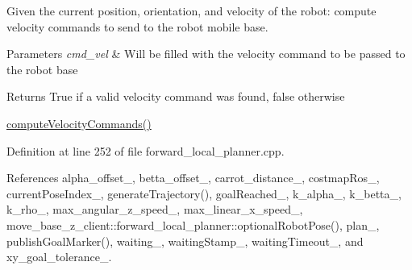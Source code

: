 Given the current position, orientation, and velocity of the robot\+: compute velocity commands to send to the robot mobile base. 


\begin{DoxyParams}{Parameters}
{\em cmd\+\_\+vel} & Will be filled with the velocity command to be passed to the robot base \\
\hline
\end{DoxyParams}
\begin{DoxyReturn}{Returns}
True if a valid velocity command was found, false otherwise
\end{DoxyReturn}
\hyperlink{classmove__base__z__client_1_1forward__local__planner_1_1ForwardLocalPlanner_a6eb89b6d08da6d4e84750705120e699a}{compute\+Velocity\+Commands()} 

Definition at line 252 of file forward\+\_\+local\+\_\+planner.\+cpp.



References alpha\+\_\+offset\+\_\+, betta\+\_\+offset\+\_\+, carrot\+\_\+distance\+\_\+, costmap\+Ros\+\_\+, current\+Pose\+Index\+\_\+, generate\+Trajectory(), goal\+Reached\+\_\+, k\+\_\+alpha\+\_\+, k\+\_\+betta\+\_\+, k\+\_\+rho\+\_\+, max\+\_\+angular\+\_\+z\+\_\+speed\+\_\+, max\+\_\+linear\+\_\+x\+\_\+speed\+\_\+, move\+\_\+base\+\_\+z\+\_\+client\+::forward\+\_\+local\+\_\+planner\+::optional\+Robot\+Pose(), plan\+\_\+, publish\+Goal\+Marker(), waiting\+\_\+, waiting\+Stamp\+\_\+, waiting\+Timeout\+\_\+, and xy\+\_\+goal\+\_\+tolerance\+\_\+.


